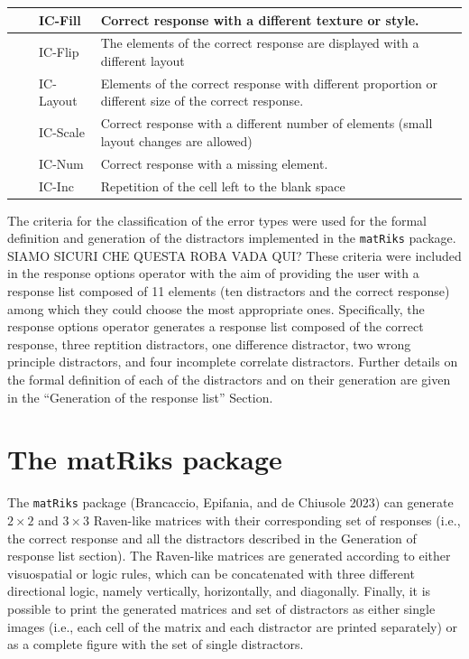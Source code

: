 \begin{table}
\begin{tabular}[t]{>{}l|l|l|l}
\hline
\textbf{} &  & IC-Fill & Correct response with a different texture or style.\\
\hline
\textbf{} &  & IC-Flip & The elements of the correct response are displayed with a different layout\\
\hline
\textbf{} &  & IC-Layout & Elements of the correct response with different proportion or different size of the correct response.\\
\hline
\textbf{} &  & IC-Scale & Correct response with a different number of elements (small layout changes are allowed)\\
\hline
\textbf{} &  & IC-Num & Correct response with a missing element.\\
\hline
\textbf{} &  & IC-Inc & Repetition of the cell left to the blank space\\
\hline
\end{tabular}
\end{table}

The criteria for the classification of the error types were used for the formal definition and generation of the distractors implemented in the \texttt{matRiks} package.
SIAMO SICURI CHE QUESTA ROBA VADA QUI?
These criteria were included in the response options operator with the aim of providing the user with a response list composed of 11 elements (ten distractors and the correct response) among which they could choose the most appropriate ones. Specifically, the response options operator generates a response list composed of the correct response, three reptition distractors, one difference distractor, two wrong principle distractors, and four incomplete correlate distractors.
Further details on the formal definition of each of the distractors and on their generation are given in the ``Generation of the response list'' Section.

\section{The matRiks package}\label{the-matriks-package}

The \texttt{matRiks} package (Brancaccio, Epifania, and de Chiusole 2023) can generate \(2 \times 2\) and \(3 \times 3\) Raven-like matrices with their corresponding set of responses (i.e., the correct response and all the distractors described in the Generation of response list section). The Raven-like matrices are generated according to either visuospatial or logic rules, which can be concatenated with three different directional logic, namely vertically, horizontally, and diagonally.
Finally, it is possible to print the generated matrices and set of distractors as either single images (i.e., each cell of the matrix and each distractor are printed separately) or as a complete figure with the set of single distractors.

